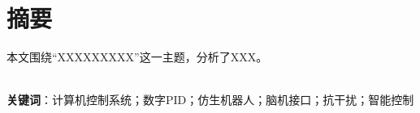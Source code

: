 
\section*{摘\quad 要}

\hspace{8mm}本文围绕“XXXXXXXXX”这一主题，分析了XXX。

~\\
\textbf{关键词}：计算机控制系统；数字PID；仿生机器人；脑机接口；抗干扰；智能控制\\

\newpage